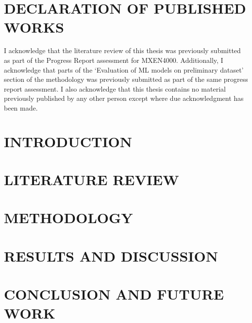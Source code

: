 \documentclass[12pt,twoside]{article}
\begin{document}
\section*{DECLARATION OF PUBLISHED WORKS}
I acknowledge that the literature review of this thesis was previously submitted as part of the Progress Report assessment for MXEN4000.
Additionally, I acknowledge that parts of the `Evaluation of ML models on preliminary dataset'
section of the methodology was previously submitted as part of the same progress report assessment.
I also acknowledge that this thesis contains no material previously
published by any other person except where due acknowledgment has been made.

\cleardoublepage

\renewcommand{\contentsname}{TABLE OF CONTENTS}
\tableofcontents
\pagebreak
\listoffigures
\listoftables
\cleardoublepage
{}

\section{INTRODUCTION}

\cleardoublepage

\section{LITERATURE REVIEW}

\cleardoublepage

\section{METHODOLOGY}

\cleardoublepage

\section{RESULTS AND DISCUSSION}

\cleardoublepage

\section{CONCLUSION AND FUTURE WORK}

\cleardoublepage

\printbibliography[title={REFERENCES},heading=bibnumbered]
\cleardoublepage

\appendix

\cleardoublepage

\cleardoublepage

\cleardoublepage

\end{document}
